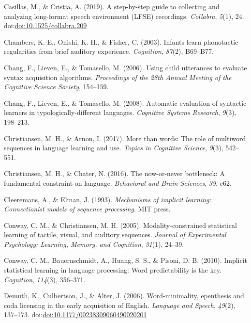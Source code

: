 \documentclass[man,mask,floatsintext]{apa6}
\begin{document}
\hypertarget{ref-casillas2019step}{}
Casillas, M., \& Cristia, A. (2019). A step-by-step guide to collecting
and analyzing long-format speech environment (LFSE) recordings.
\emph{Collabra}, \emph{5}(1), 24.
doi:\href{https://doi.org/doi:10.1525/collabra.209}{doi:10.1525/collabra.209}

\hypertarget{ref-chambers2003infants}{}
Chambers, K. E., Onishi, K. H., \& Fisher, C. (2003). Infants learn
phonotactic regularities from brief auditory experience.
\emph{Cognition}, \emph{87}(2), B69--B77.

\hypertarget{ref-chang2006using}{}
Chang, F., Lieven, E., \& Tomasello, M. (2006). Using child utterances
to evaluate syntax acquisition algorithms. \emph{Proceedings of the 28th
Annual Meeting of the Cognitive Science Society}, 154--159.

\hypertarget{ref-chang2008automatic}{}
Chang, F., Lieven, E., \& Tomasello, M. (2008). Automatic evaluation of
syntactic learners in typologically-different languages. \emph{Cognitive
Systems Research}, \emph{9}(3), 198--213.

\hypertarget{ref-christiansen2017more}{}
Christiansen, M. H., \& Arnon, I. (2017). More than words: The role of
multiword sequences in language learning and use. \emph{Topics in
Cognitive Science}, \emph{9}(3), 542--551.

\hypertarget{ref-christiansen2016now}{}
Christiansen, M. H., \& Chater, N. (2016). The now-or-never bottleneck:
A fundamental constraint on language. \emph{Behavioral and Brain
Sciences}, \emph{39}, e62.

\hypertarget{ref-cleeremans1993mechanisms}{}
Cleeremans, A., \& Elman, J. (1993). \emph{Mechanisms of implicit
learning: Connectionist models of sequence processing}. MIT press.

\hypertarget{ref-conway2005modality}{}
Conway, C. M., \& Christiansen, M. H. (2005). Modality-constrained
statistical learning of tactile, visual, and auditory sequences.
\emph{Journal of Experimental Psychology: Learning, Memory, and
Cognition}, \emph{31}(1), 24--39.

\hypertarget{ref-conway2010implicit}{}
Conway, C. M., Bauernschmidt, A., Huang, S. S., \& Pisoni, D. B. (2010).
Implicit statistical learning in language processing: Word
predictability is the key. \emph{Cognition}, \emph{114}(3), 356--371.

\hypertarget{ref-demuth2006word}{}
Demuth, K., Culbertson, J., \& Alter, J. (2006). Word-minimality,
epenthesis and coda licensing in the early acquisition of English.
\emph{Language and Speech}, \emph{49}(2), 137--173.
doi:\href{https://doi.org/doi:10.1177/00238309060490020201}{doi:10.1177/00238309060490020201}
\end{document}
